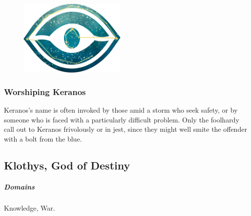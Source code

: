     \pagebreak~
    \vspace{14.0cm}


    \begin{figure}[b]
        \centering
        \includegraphics[width=0.47\textwidth]{02viphoger/img/10s_keranos.png}
    \end{figure}

    \subsubsection{Worshiping Keranos}
        Keranos's name is often invoked by those amid a storm who seek safety, or by someone who is faced with a particularly difficult problem.
        Only the foolhardy call out to Keranos frivolously or in jest, since they might well smite the offender with a bolt from the blue.

        \pagebreak


\subsection*{Klothys, God of Destiny} \label{ssec::klothys}
    \subparagraph{Domains} Knowledge, War.

